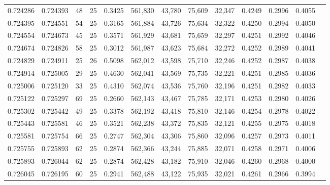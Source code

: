 \begin{tabular}{rrrrrrrrrrrrr}
0.724286 & 0.724393 &    48 &  25 &                                     0.3425 & 561,830 &  43,780 &  75,609 &  32,347 & 0.4249 & 0.2996 & 0.4055 \\
0.724395 & 0.724551 &    54 &  25 &                                     0.3165 & 561,884 &  43,726 &  75,634 &  32,322 & 0.4250 & 0.2994 & 0.4050 \\
0.724554 & 0.724673 &    45 &  25 &                                     0.3571 & 561,929 &  43,681 &  75,659 &  32,297 & 0.4251 & 0.2992 & 0.4046 \\
0.724674 & 0.724826 &    58 &  25 &                                     0.3012 & 561,987 &  43,623 &  75,684 &  32,272 & 0.4252 & 0.2989 & 0.4041 \\
0.724829 & 0.724911 &    25 &  26 &                                     0.5098 & 562,012 &  43,598 &  75,710 &  32,246 & 0.4252 & 0.2987 & 0.4038 \\
0.724914 & 0.725005 &    29 &  25 &                                     0.4630 & 562,041 &  43,569 &  75,735 &  32,221 & 0.4251 & 0.2985 & 0.4036 \\
0.725006 & 0.725120 &    33 &  25 &                                     0.4310 & 562,074 &  43,536 &  75,760 &  32,196 & 0.4251 & 0.2982 & 0.4033 \\
0.725122 & 0.725297 &    69 &  25 &                                     0.2660 & 562,143 &  43,467 &  75,785 &  32,171 & 0.4253 & 0.2980 & 0.4026 \\
0.725302 & 0.725442 &    49 &  25 &                                     0.3378 & 562,192 &  43,418 &  75,810 &  32,146 & 0.4254 & 0.2978 & 0.4022 \\
0.725443 & 0.725581 &    46 &  25 &                                     0.3521 & 562,238 &  43,372 &  75,835 &  32,121 & 0.4255 & 0.2975 & 0.4018 \\
0.725581 & 0.725754 &    66 &  25 &                                     0.2747 & 562,304 &  43,306 &  75,860 &  32,096 & 0.4257 & 0.2973 & 0.4011 \\
0.725755 & 0.725893 &    62 &  25 &                                     0.2874 & 562,366 &  43,244 &  75,885 &  32,071 & 0.4258 & 0.2971 & 0.4006 \\
0.725893 & 0.726044 &    62 &  25 &                                     0.2874 & 562,428 &  43,182 &  75,910 &  32,046 & 0.4260 & 0.2968 & 0.4000 \\
0.726045 & 0.726195 &    60 &  25 &                                     0.2941 & 562,488 &  43,122 &  75,935 &  32,021 & 0.4261 & 0.2966 & 0.3994 \\

\end{tabular}
